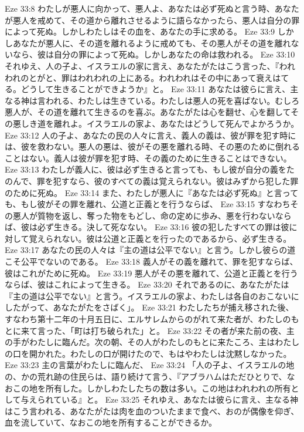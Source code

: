 Eze 33:8  わたしが悪人に向かって、悪人よ、あなたは必ず死ぬと言う時、あなたが悪人を戒めて、その道から離れさせるように語らなかったら、悪人は自分の罪によって死ぬ。しかしわたしはその血を、あなたの手に求める。
Eze 33:9  しかしあなたが悪人に、その道を離れるように戒めても、その悪人がその道を離れないなら、彼は自分の罪によって死ぬ。しかしあなたの命は救われる。
Eze 33:10  それゆえ、人の子よ、イスラエルの家に言え、あなたがたはこう言った、『われわれのとがと、罪はわれわれの上にある。われわれはその中にあって衰えはてる。どうして生きることができようか』と。
Eze 33:11  あなたは彼らに言え、主なる神は言われる、わたしは生きている。わたしは悪人の死を喜ばない。むしろ悪人が、その道を離れて生きるのを喜ぶ。あなたがたは心を翻せ、心を翻してその悪しき道を離れよ。イスラエルの家よ、あなたはどうして死んでよかろうか。
Eze 33:12  人の子よ、あなたの民の人々に言え、義人の義は、彼が罪を犯す時には、彼を救わない。悪人の悪は、彼がその悪を離れる時、その悪のために倒れることはない。義人は彼が罪を犯す時、その義のために生きることはできない。
Eze 33:13  わたしが義人に、彼は必ず生きると言っても、もし彼が自分の義をたのんで、罪を犯すなら、彼のすべての義は覚えられない。彼はみずから犯した罪のために死ぬ。
Eze 33:14  また、わたしが悪人に『あなたは必ず死ぬ』と言っても、もし彼がその罪を離れ、公道と正義とを行うならば、
Eze 33:15  すなわちその悪人が質物を返し、奪った物をもどし、命の定めに歩み、悪を行わないならば、彼は必ず生きる。決して死なない。
Eze 33:16  彼の犯したすべての罪は彼に対して覚えられない。彼は公道と正義とを行ったのであるから、必ず生きる。
Eze 33:17  あなたの民の人々は『主の道は公平でない』と言う。しかし彼らの道こそ公平でないのである。
Eze 33:18  義人がその義を離れて、罪を犯すならば、彼はこれがために死ぬ。
Eze 33:19  悪人がその悪を離れて、公道と正義とを行うならば、彼はこれによって生きる。
Eze 33:20  それであるのに、あなたがたは『主の道は公平でない』と言う。イスラエルの家よ、わたしは各自のおこないにしたがって、あなたがたをさばく」。
Eze 33:21  わたしたちが捕え移された後、すなわち第十二年の十月五日に、エルサレムからのがれて来た者が、わたしのもとに来て言った、「町は打ち破られた」と。
Eze 33:22  その者が来た前の夜、主の手がわたしに臨んだ。次の朝、その人がわたしのもとに来たころ、主はわたしの口を開かれた。わたしの口が開けたので、もはやわたしは沈黙しなかった。
Eze 33:23  主の言葉がわたしに臨んだ、
Eze 33:24  「人の子よ、イスラエルの地の、かの荒れ跡の住民らは、語り続けて言う、『アブラハムはただひとりで、なおこの地を所有した。しかしわたしたちの数は多い。この地はわれわれの所有として与えられている』と。
Eze 33:25  それゆえ、あなたは彼らに言え、主なる神はこう言われる、あなたがたは肉を血のついたままで食べ、おのが偶像を仰ぎ、血を流していて、なおこの地を所有することができるか。
